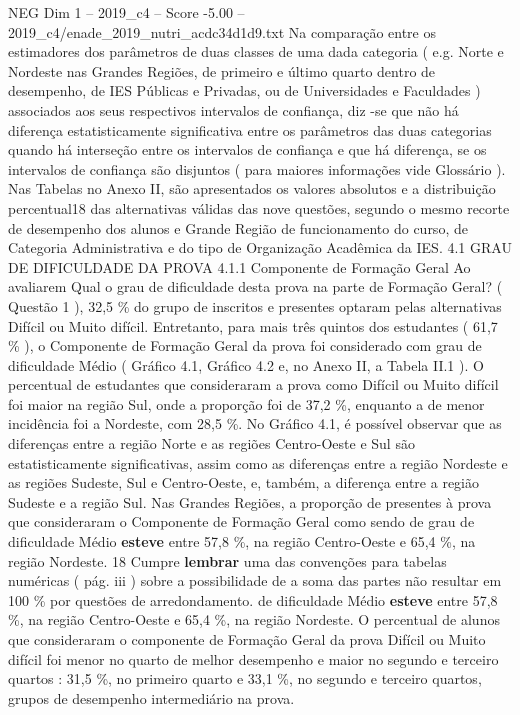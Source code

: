 \begin{textsample}{NEG Dim 1 – 2019\_c4 – Score -5.00 – 2019\_c4/enade\_2019\_nutri\_acdc34d1d9.txt}
Na comparação entre os estimadores dos parâmetros de duas classes de uma dada categoria ( e.g.
Norte e Nordeste nas Grandes Regiões, de primeiro e último quarto dentro de desempenho, de IES Públicas e Privadas, ou de Universidades e Faculdades ) associados aos seus respectivos intervalos de confiança, diz -se que não há diferença estatisticamente significativa entre os parâmetros das duas categorias quando há interseção entre os intervalos de confiança e que há diferença, se os intervalos de confiança são disjuntos ( para maiores informações vide Glossário ).
Nas Tabelas no Anexo II, são apresentados os valores absolutos e a distribuição percentual18 das alternativas válidas das nove questões, segundo o mesmo recorte de desempenho dos alunos e Grande Região de funcionamento do curso, de Categoria Administrativa e do tipo de Organização Acadêmica da IES. 4.1 GRAU DE DIFICULDADE DA PROVA 4.1.1 Componente de Formação Geral Ao avaliarem Qual o grau de dificuldade desta prova na parte de Formação Geral? ( Questão 1 ), 32,5 \% do grupo de inscritos e presentes optaram pelas alternativas Difícil ou Muito difícil.
Entretanto, para mais três quintos dos estudantes ( 61,7 \% ), o Componente de Formação Geral da prova foi considerado com grau de dificuldade Médio ( Gráfico 4.1, Gráfico 4.2 e, no Anexo II, a Tabela II.1 ).
O percentual de estudantes que consideraram a prova como Difícil ou Muito difícil foi maior na região Sul, onde a proporção foi de 37,2 \%, enquanto a de menor incidência foi a Nordeste, com 28,5 \%.
No Gráfico 4.1, é possível observar que as diferenças entre a região Norte e as regiões Centro-Oeste e Sul são estatisticamente significativas, assim como as diferenças entre a região Nordeste e as regiões Sudeste, Sul e Centro-Oeste, e, também, a diferença entre a região Sudeste e a região Sul.
Nas Grandes Regiões, a proporção de presentes à prova que consideraram o Componente de Formação Geral como sendo de grau de dificuldade Médio \textbf{esteve} entre 57,8 \%, na região Centro-Oeste e 65,4 \%, na região Nordeste. 18 Cumpre \textbf{lembrar} uma das convenções para tabelas numéricas ( pág. iii ) sobre a possibilidade de a soma das partes não resultar em 100 \% por questões de arredondamento. de dificuldade Médio \textbf{esteve} entre 57,8 \%, na região Centro-Oeste e 65,4 \%, na região Nordeste.
O percentual de alunos que consideraram o componente de Formação Geral da prova Difícil ou Muito difícil foi menor no quarto de melhor desempenho e maior no segundo e terceiro quartos : 31,5 \%, no primeiro quarto e 33,1 \%, no segundo e terceiro quartos, grupos de desempenho intermediário na prova.

\end{textsample}
